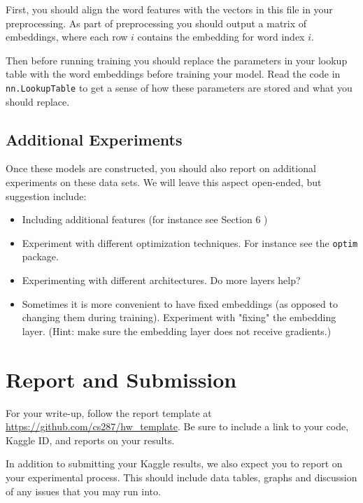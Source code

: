 \documentclass[11pt]{article}
\begin{document}
First, you should align the word
features with the vectors in this file in your preprocessing. 
As part of preprocessing you should output a matrix of
embeddings, where each row $i$ contains the embedding for 
word index $i$.

Then before running training you should replace the parameters in your
lookup table with the word embeddings before training your model. Read
the code in \texttt{nn.LookupTable} to get a sense of how these
parameters are stored and what you should replace.

\subsection{Additional Experiments}

Once these models are constructed, you should also report on
additional experiments on these data sets. We will leave this aspect
open-ended, but suggestion include:

\begin{itemize}
\item Including additional features (for instance see Section 6 \citep{collobert2011natural})
\item Experiment with different optimization techniques. For instance see the \texttt{optim} package. 
\item Experimenting with different architectures. Do more layers help? 
\item Sometimes it is more convenient to have fixed embeddings (as opposed to changing them during training). Experiment with "fixing" the embedding layer. (Hint: make sure the embedding layer does not receive gradients.)
\end{itemize}

\section{Report and Submission}

For your write-up, follow the report template at
\url{https://github.com/cs287/hw_template}. Be sure to include a link
to your code, Kaggle ID, and reports on your results.

In addition to submitting your Kaggle results, we also expect you to report on your 
experimental process. This should include data tables, graphs and discussion of any 
issues that you may run into. 

 

\end{document}
